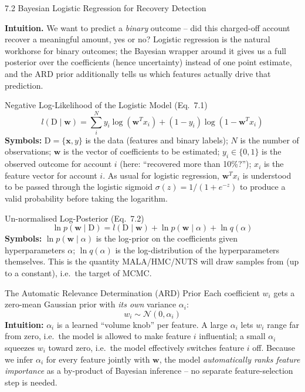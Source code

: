 \documentclass[aspectratio=169,10pt]{beamer}
\newcommand{\bw}{\mathbf{w}}
\newcommand{\bx}{\mathbf{x}}
\begin{document}
\begin{frame}[allowframebreaks]{7.2 Bayesian Logistic Regression for Recovery Detection}

\textbf{Intuition.} We want to predict a \emph{binary} outcome -- did this charged-off account recover a meaningful amount, yes or no? Logistic regression is the natural workhorse for binary outcomes; the Bayesian wrapper around it gives us a full posterior over the coefficients (hence uncertainty) instead of one point estimate, and the ARD prior additionally tells us which features actually drive that prediction.

\begin{block}{Negative Log-Likelihood of the Logistic Model (Eq.~7.1)}
\[
  l(\mathrm{D}\mid \bw) = \sum_{i}^{N} y_i \log(\bw^T x_i) + (1-y_i)\log(1-\bw^T x_i)
\]
\textbf{Symbols:} $\mathrm{D} = \{\bx, y\}$ is the data (features and binary labels); $N$ is the number of observations; $\bw$ is the vector of coefficients to be estimated; $y_i \in \{0,1\}$ is the observed outcome for account $i$ (here: ``recovered more than 10\%?''); $x_i$ is the feature vector for account $i$. As usual for logistic regression, $\bw^T x_i$ is understood to be passed through the logistic sigmoid $\sigma(z) = 1/(1+e^{-z})$ to produce a valid probability before taking the logarithm.
\end{block}

\begin{block}{Un-normalised Log-Posterior (Eq.~7.2)}
\[
  \ln p(\bw \mid \mathrm{D}) = l(\mathrm{D}\mid \bw) + \ln p(\bw \mid \alpha) + \ln q(\alpha)
\]
\textbf{Symbols:} $\ln p(\bw\mid\alpha)$ is the log-prior on the coefficients given hyperparameters $\alpha$; $\ln q(\alpha)$ is the log-distribution of the hyperparameters themselves. This is the quantity MALA/HMC/NUTS will draw samples from (up to a constant), i.e.\ the target of MCMC.
\end{block}

\framebreak

\begin{block}{The Automatic Relevance Determination (ARD) Prior}
Each coefficient $w_i$ gets a zero-mean Gaussian prior with \emph{its own} variance $\alpha_i$:
\[
  w_i \sim \mathcal{N}(0, \alpha_i)
\]
\textbf{Intuition:} $\alpha_i$ is a learned ``volume knob'' per feature. A large $\alpha_i$ lets $w_i$ range far from zero, i.e.\ the model is allowed to make feature $i$ influential; a small $\alpha_i$ squeezes $w_i$ toward zero, i.e.\ the model effectively switches feature $i$ off. Because we infer $\alpha_i$ for every feature jointly with $\bw$, the model \emph{automatically ranks feature importance} as a by-product of Bayesian inference -- no separate feature-selection step is needed.
\end{block}


\end{frame}
\end{document}
